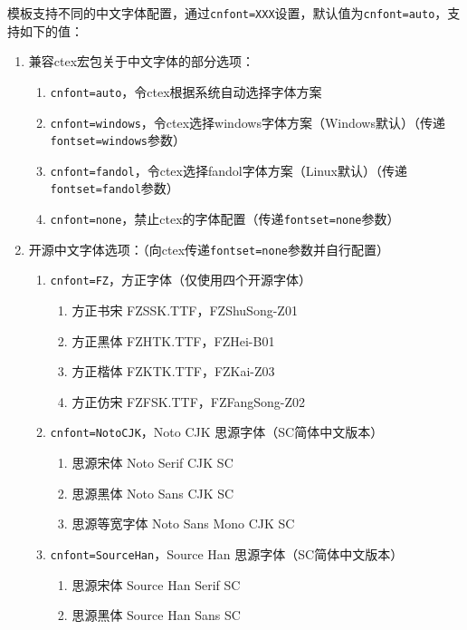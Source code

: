 \documentclass[cnfont=NotoCJK]{../simplenote}
\begin{document}
模板支持不同的中文字体配置，通过\lstinline{cnfont=XXX}设置，默认值为\lstinline{cnfont=auto}，支持如下的值：
\begin{enumerate}
    \item 兼容ctex宏包关于中文字体的部分选项：
          \begin{enumerate}
              \item \lstinline{cnfont=auto}，令ctex根据系统自动选择字体方案
              \item \lstinline{cnfont=windows}，令ctex选择windows字体方案（Windows默认）（传递\lstinline{fontset=windows}参数）
              \item \lstinline{cnfont=fandol}，令ctex选择fandol字体方案（Linux默认）（传递\lstinline{fontset=fandol}参数）
              \item \lstinline{cnfont=none}，禁止ctex的字体配置（传递\lstinline{fontset=none}参数）
          \end{enumerate}
    \item 开源中文字体选项：（向ctex传递\lstinline{fontset=none}参数并自行配置）
          \begin{enumerate}
              \item \lstinline{cnfont=FZ}，方正字体（仅使用四个开源字体）
                    \begin{enumerate}
                        \item 方正书宋 FZSSK.TTF，FZShuSong-Z01
                        \item 方正黑体 FZHTK.TTF，FZHei-B01
                        \item 方正楷体 FZKTK.TTF，FZKai-Z03
                        \item 方正仿宋 FZFSK.TTF，FZFangSong-Z02
                    \end{enumerate}
              \item \lstinline{cnfont=NotoCJK}，Noto CJK 思源字体（SC简体中文版本）
                    \begin{enumerate}
                        \item 思源宋体 Noto Serif CJK SC
                        \item 思源黑体 Noto Sans CJK SC
                        \item 思源等宽字体 Noto Sans Mono CJK SC
                    \end{enumerate}
              \item \lstinline{cnfont=SourceHan}，Source Han 思源字体（SC简体中文版本）
                    \begin{enumerate}
                        \item 思源宋体 Source Han Serif SC
                        \item 思源黑体 Source Han Sans SC
                    \end{enumerate}
          \end{enumerate}
\end{enumerate}
\end{document}
